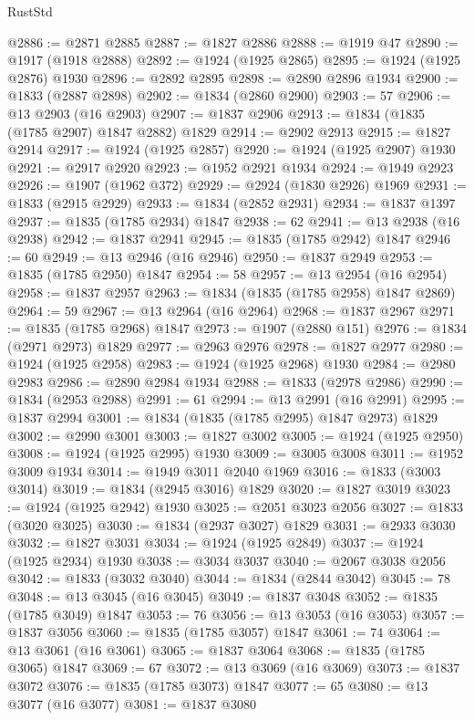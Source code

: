 \begin{lexlean}{RustStd}
\begin{coremodule}
@2886 := @2871 @2885
@2887 := @1827 @2886
@2888 := @1919 @47
@2890 := @1917 (@1918 @2888)
@2892 := @1924 (@1925 @2865)
@2895 := @1924 (@1925 @2876) @1930
@2896 := @2892 @2895
@2898 := @2890 @2896 @1934
@2900 := @1833 (@2887 @2898)
@2902 := @1834 (@2860 @2900)
@2903 := 57
@2906 := @13 @2903 (@16 @2903)
@2907 := @1837 @2906
@2913 := @1834 (@1835 (@1785 @2907) @1847 @2882) @1829
@2914 := @2902 @2913
@2915 := @1827 @2914
@2917 := @1924 (@1925 @2857)
@2920 := @1924 (@1925 @2907) @1930
@2921 := @2917 @2920
@2923 := @1952 @2921 @1934
@2924 := @1949 @2923
@2926 := @1907 (@1962 @372)
@2929 := @2924 (@1830 @2926) @1969
@2931 := @1833 (@2915 @2929)
@2933 := @1834 (@2852 @2931)
@2934 := @1837 @1397
@2937 := @1835 (@1785 @2934) @1847
@2938 := 62
@2941 := @13 @2938 (@16 @2938)
@2942 := @1837 @2941
@2945 := @1835 (@1785 @2942) @1847
@2946 := 60
@2949 := @13 @2946 (@16 @2946)
@2950 := @1837 @2949
@2953 := @1835 (@1785 @2950) @1847
@2954 := 58
@2957 := @13 @2954 (@16 @2954)
@2958 := @1837 @2957
@2963 := @1834 (@1835 (@1785 @2958) @1847 @2869)
@2964 := 59
@2967 := @13 @2964 (@16 @2964)
@2968 := @1837 @2967
@2971 := @1835 (@1785 @2968) @1847
@2973 := @1907 (@2880 @151)
@2976 := @1834 (@2971 @2973) @1829
@2977 := @2963 @2976
@2978 := @1827 @2977
@2980 := @1924 (@1925 @2958)
@2983 := @1924 (@1925 @2968) @1930
@2984 := @2980 @2983
@2986 := @2890 @2984 @1934
@2988 := @1833 (@2978 @2986)
@2990 := @1834 (@2953 @2988)
@2991 := 61
@2994 := @13 @2991 (@16 @2991)
@2995 := @1837 @2994
@3001 := @1834 (@1835 (@1785 @2995) @1847 @2973) @1829
@3002 := @2990 @3001
@3003 := @1827 @3002
@3005 := @1924 (@1925 @2950)
@3008 := @1924 (@1925 @2995) @1930
@3009 := @3005 @3008
@3011 := @1952 @3009 @1934
@3014 := @1949 @3011 @2040 @1969
@3016 := @1833 (@3003 @3014)
@3019 := @1834 (@2945 @3016) @1829
@3020 := @1827 @3019
@3023 := @1924 (@1925 @2942) @1930
@3025 := @2051 @3023 @2056
@3027 := @1833 (@3020 @3025)
@3030 := @1834 (@2937 @3027) @1829
@3031 := @2933 @3030
@3032 := @1827 @3031
@3034 := @1924 (@1925 @2849)
@3037 := @1924 (@1925 @2934) @1930
@3038 := @3034 @3037
@3040 := @2067 @3038 @2056
@3042 := @1833 (@3032 @3040)
@3044 := @1834 (@2844 @3042)
@3045 := 78
@3048 := @13 @3045 (@16 @3045)
@3049 := @1837 @3048
@3052 := @1835 (@1785 @3049) @1847
@3053 := 76
@3056 := @13 @3053 (@16 @3053)
@3057 := @1837 @3056
@3060 := @1835 (@1785 @3057) @1847
@3061 := 74
@3064 := @13 @3061 (@16 @3061)
@3065 := @1837 @3064
@3068 := @1835 (@1785 @3065) @1847
@3069 := 67
@3072 := @13 @3069 (@16 @3069)
@3073 := @1837 @3072
@3076 := @1835 (@1785 @3073) @1847
@3077 := 65
@3080 := @13 @3077 (@16 @3077)
@3081 := @1837 @3080

\end{coremodule}
\end{lexlean}
